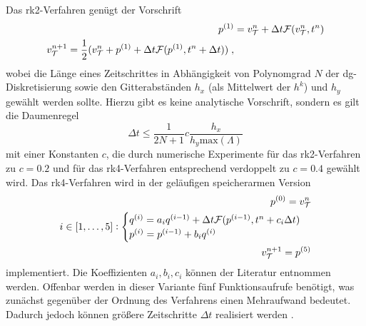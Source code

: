 Das \ac{rk}2-Verfahren genügt der Vorschrift
\begin{equation}
  \begin{aligned}
    p^{(1)} &= v_{\mathcal{T}}^n + \Delta t \mathcal{F}(v_{\mathcal{T}}^n,t^n) \\
    v_{\mathcal{T}}^{n+1} = \frac{1}{2}(v_{\mathcal{T}}^n + p^{(1)} + \Delta t \mathcal{F}(p^{(1)},t^n+\Delta t)) \; ,
  \end{aligned}
\end{equation}
wobei die Länge eines Zeitschrittes in Abhängigkeit von Polynomgrad $N$ der \ac{dg}-Diskretisierung sowie den Gitterabständen $h_x$ (als Mittelwert der $h^k$) und $h_y$ gewählt werden sollte. Hierzu gibt es keine analytische Vorschrift, sondern es gilt die Daumenregel \cite{buch}
\begin{equation}
  \Delta t \leq \frac{1}{2N+1}c\frac{h_x}{h_y \text{max}(\Lambda)}
\end{equation}
mit einer Konstanten $c$, die durch numerische Experimente für das \ac{rk}2-Verfahren zu $c=0.2$ und für das \ac{rk}4-Verfahren entsprechend verdoppelt zu $c=0.4$ gewählt wird. Das \ac{rk}4-Verfahren wird in der geläufigen speicherarmen Version
\begin{equation}
  \begin{aligned}
    p^{(0)} = v_{\mathcal{T}}^n \\
    i\in [1,\dots,5]: \begin{cases}
      q^{(i)} = a_i q^{(i-1)} + \Delta t \mathcal{F}(p^{(i-1)},t^n+c_i \Delta t) \\
      p^{(i)} = p^{(i-1)}+b_iq^{(i)}
  \end{cases} \\
  v_{\mathcal{T}}^{n+1} = p^{(5)}
  \end{aligned}
\end{equation}
implementiert. Die Koeffizienten $a_i,b_i,c_i$ können der Literatur \cite{buch} entnommen werden. Offenbar werden in dieser Variante fünf Funktionsaufrufe benötigt, was zunächst gegenüber der Ordnung des Verfahrens einen Mehraufwand bedeutet. Dadurch jedoch können größere Zeitschritte $\Delta t$ realisiert werden \cite{buch}.

